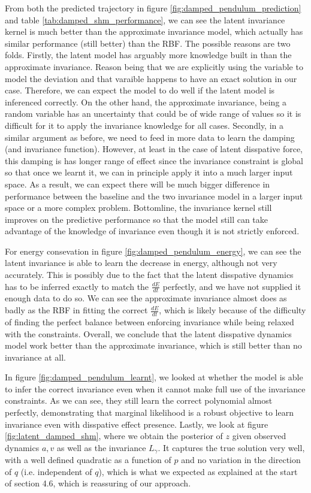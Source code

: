 \documentclass{statsmsc}
\begin{document}
From both the predicted trajectory in figure \ref{fig:damped_pendulum_prediction} and table \ref{tab:damped_shm_performance}, we can see the latent invariance kernel is much better than the approximate invariance model, which actually has similar performance (still better) than the RBF. 
The possible reasons are two folds.
Firstly, the latent model has arguably more knowledge built in than the approximate invariance. Reason being that we are explicitly using the variable to model the deviation and that varaible happens to have an exact solution in our case.
Therefore, we can expect the model to do well if the latent model is inferenced correctly.
On the other hand, the approximate invariance, being a random variable has an uncertainty that could be of wide range of values so it is difficult for it to apply the invariance knowledge for all cases.
Secondly, in a similar argument as before, we need to feed in more data to learn the damping (and invariance function).
However, at least in the case of latent disspative force, this damping is has longer range of effect since the invariance constraint is global so that once we learnt it, we can in principle apply it into a much larger input space.
As a result, we can expect there will be much bigger difference in performance between the baseline and the two invariance model in a larger input space or a more complex problem.
Bottomline, the invariance kernel still improves on the predictive performance so that the model still can take advantage of the knowledge of invariance even though it is not strictly enforced. 

For energy consevation in figure \ref{fig:damped_pendulum_energy}, we can see the latent invariance is able to learn the decrease in energy, although not very accurately.
This is possibly due to the fact that the latent disspative dynamics has to be inferred exactly to match the $\frac{dE}{dt}$ perfectly, and we have not supplied it enough data to do so.
We can see the approximate invariance almost does as badly as the RBF in fitting the correct $\frac{dE}{dt}$, which is likely because of the difficulty of finding the perfect balance between enforcing invariance while being relaxed with the constraints.
Overall, we conclude that the latent disspative dynamics model work better than the approximate invariance, which is still better than no invariance at all.

In figure \ref{fig:damped_pendulum_learnt}, we looked at whether the model is able to infer the correct invariance even when it cannot make full use of the invariance constraints.
As we can see, they still learn the correct polynomial almost perfectly, demonstrating that marginal likelihood is a robust objective to learn invariance even with disspative effect presence.
Lastly, we look at figure \ref{fig:latent_damped_shm}, where we obtain the posterior of $z$ given observed dynamics $a, v$ as well as the invariance $L_\gamma$.
It captures the true solution very well, with a well defined quadratic as a function of $p$ and no variation in the direction of $q$ (i.e. independent of $q$), which is what we expected as explained at the start of section 4.6, which is reassuring of our approach.
\end{document}
